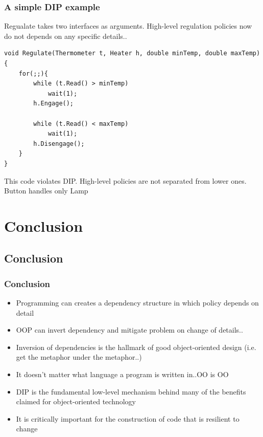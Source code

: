 \documentclass{beamer}
\begin{document}
\begin{frame}[containsverbatim]
	\frametitle{A simple DIP example}
	Regualate takes two interfaces as arguments. High-level regulation policies now do not depends on any specific details.. \\
	\begin{lstlisting}
void Regulate(Thermometer t, Heater h, double minTemp, double maxTemp){
	for(;;){
		while (t.Read() > minTemp)
			wait(1);
		h.Engage();

		while (t.Read() < maxTemp)
			wait(1);
		h.Disengage();
	}
}
	\end{lstlisting}
	This code violates DIP. High-level policies are not separated from lower ones. Button handles only Lamp
\end{frame}

\section{Conclusion}
\subsection{Conclusion}
\begin{frame}
  \frametitle{Conclusion}
  \begin{itemize}
	\item<+-> Programming can creates a dependency structure in which policy depends on detail
	\item<+-> OOP can invert dependency and mitigate problem on change of details..
	\item<+-> Inversion of dependencies is the hallmark of good object-oriented design (i.e. get the metaphor under the metaphor..)
	\item<+->  It doesn't matter what language a program is written in..OO is OO
	\item<+-> DIP is the fundamental low-level mechanism behind many of the benefits claimed for object-oriented technology
	\item<+-> It is critically important for the construction of code that is resilient to change
   \end{itemize}
\end{frame}
\end{document}
